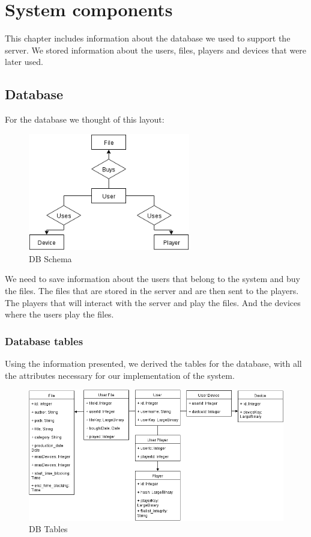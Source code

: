 \documentclass[11pt,a4paper]{report}
\begin{document}
\chapter{System components}
This chapter includes information about the database we used to support the server.
We stored information about the users, files, players and devices that were later used.

\section{Database}
For the database we thought of this layout:

\begin{figure}[H]
\centerline{\includegraphics[width=200pt]{images/dbSchema.png}}
\caption{DB Schema}
\label{schema}
\end{figure}

We need to save information about the users that belong to the system and buy the files. 
The files that are stored in the server and are then sent to the players. The players that will interact with the server and play the files. And the devices where the users play the files.

\subsection{Database tables}
Using the information presented, we derived the tables for the database, with all the attributes necessary for our implementation of the system.

\begin{figure}[H]
\centerline{\includegraphics[width=500pt]{images/dbTables.png}}
\caption{DB Tables}
\label{tables}
\end{figure}
\end{document}
